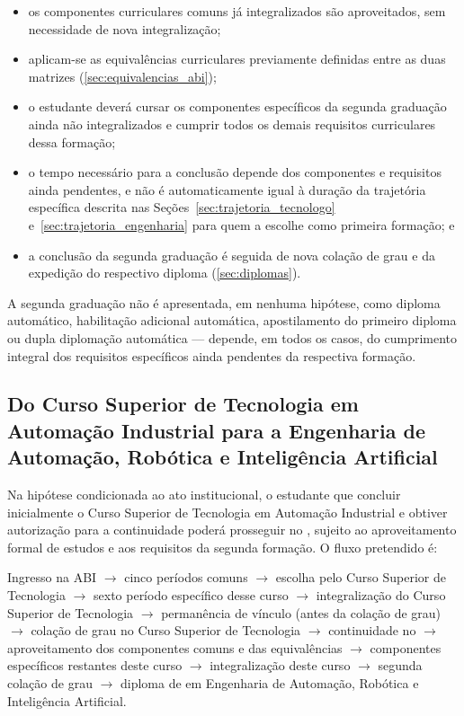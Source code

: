 \begin{itemize}
    \item os componentes curriculares comuns já integralizados são aproveitados, sem necessidade de nova integralização;
    \item aplicam-se as equivalências curriculares previamente definidas entre as duas matrizes (\autoref{sec:equivalencias_abi});
    \item o estudante deverá cursar os componentes específicos da segunda graduação ainda não integralizados e cumprir todos os demais requisitos curriculares dessa formação;
    \item o tempo necessário para a conclusão depende dos componentes e requisitos ainda pendentes, e não é automaticamente igual à duração da trajetória específica descrita nas Seções~\ref{sec:trajetoria_tecnologo} e~\ref{sec:trajetoria_engenharia} para quem a escolhe como primeira formação; e
    \item a conclusão da segunda graduação é seguida de nova colação de grau e da expedição do respectivo diploma (\autoref{sec:diplomas}).
\end{itemize}

A segunda graduação não é apresentada, em nenhuma hipótese, como diploma automático, habilitação adicional automática, apostilamento do primeiro diploma ou dupla diplomação automática — depende, em todos os casos, do cumprimento integral dos requisitos específicos ainda pendentes da respectiva formação.

\subsection{Do Curso Superior de Tecnologia em Automação Industrial para a Engenharia de Automação, Robótica e Inteligência Artificial}

Na hipótese condicionada ao ato institucional, o estudante que concluir inicialmente o Curso Superior de Tecnologia em Automação Industrial e obtiver autorização para a continuidade poderá prosseguir no \ppccurso, sujeito ao aproveitamento formal de estudos e aos requisitos da segunda formação. O fluxo pretendido é:

\begin{center}
Ingresso na ABI $\to$ cinco períodos comuns $\to$ escolha pelo Curso Superior de Tecnologia $\to$ sexto período específico desse curso $\to$ integralização do Curso Superior de Tecnologia $\to$ permanência de vínculo (antes da colação de grau) $\to$ colação de grau no Curso Superior de Tecnologia $\to$ continuidade no \ppccurso $\to$ aproveitamento dos componentes comuns e das equivalências $\to$ componentes específicos restantes deste curso $\to$ integralização deste curso $\to$ segunda colação de grau $\to$ diploma de \ppcgrau em Engenharia de Automação, Robótica e Inteligência Artificial.
\end{center}

